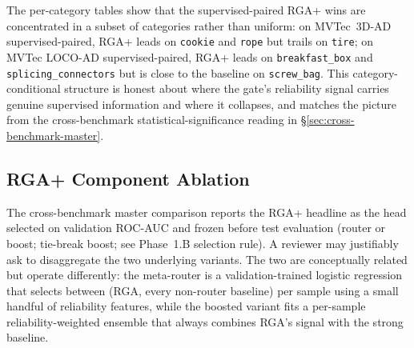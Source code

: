 \documentclass[10pt,conference]{IEEEtran}
\newcommand{\methodplus}{RGA+}
\begin{document}


The per-category tables show that the supervised-paired RGA+ wins are
concentrated in a subset of categories rather than uniform: on
MVTec~3D-AD supervised-paired, RGA+ leads on \texttt{cookie} and
\texttt{rope} but trails on \texttt{tire}; on MVTec LOCO-AD
supervised-paired, RGA+ leads on \texttt{breakfast\_box} and
\texttt{splicing\_connectors} but is close to the baseline on
\texttt{screw\_bag}. This category-conditional structure is honest
about where the gate's reliability signal carries genuine supervised
information and where it collapses, and matches the picture from the
cross-benchmark statistical-significance reading in
§\ref{sec:cross-benchmark-master}.

\subsection{RGA+ Component Ablation}
\label{sec:rga-plus-ablation}

The cross-benchmark master comparison reports the \methodplus{}
headline as the head selected on validation ROC-AUC and frozen before
test evaluation (router or boost; tie-break boost; see Phase~1.B
selection rule). A reviewer may justifiably ask to disaggregate the
two underlying variants. The two are conceptually related but operate
differently: the meta-router is a validation-trained logistic
regression that selects between (RGA, every non-router baseline) per
sample using a small handful of reliability features, while the
boosted variant fits a per-sample reliability-weighted ensemble that
always combines RGA's signal with the strong baseline.
\end{document}
